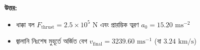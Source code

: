 \documentclass[12pt, a4paper]{article}
\begin{document}
\begin{tcolorbox}[answerbox]
\textbf{\color{success} উত্তর:} 
\begin{itemize}
    \item[(ক)] ধাক্কা বল $F_{\text{thrust}} = 2.5 \times 10^5\text{ N}$ এবং প্রারম্ভিক ত্বরণ $a_0 = 15.20\text{ ms}^{-2}$
    \item[(খ)] জ্বালানি নিঃশেষ মুহূর্তে অর্জিত বেগ $v_{\text{final}} = 3239.60\text{ ms}^{-1}$ (বা $3.24\text{ km/s}$)
\end{itemize}
\end{tcolorbox}
\vspace{1em}

\end{document}
